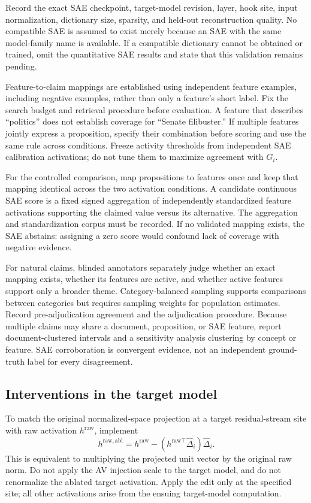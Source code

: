 Record the exact SAE checkpoint, target-model revision, layer, hook site,
input normalization, dictionary size, sparsity, and held-out reconstruction
quality. No compatible SAE is assumed to exist merely because an SAE with
the same model-family name is available. If a compatible dictionary cannot be
obtained or trained, omit the quantitative SAE results and state that this
validation remains pending.

Feature-to-claim mappings are established using independent feature examples,
including negative examples, rather than only a feature's short label. Fix the
search budget and retrieval procedure before evaluation. A feature that
describes ``politics'' does not establish coverage for ``Senate filibuster.''
If multiple features jointly express a proposition, specify their combination
before scoring and use the same rule across conditions. Freeze activity
thresholds from independent SAE calibration activations; do not tune them to
maximize agreement with $G_i$.

For the controlled comparison, map propositions to features once and keep
that mapping identical across the two activation conditions. A candidate
continuous SAE score is a fixed signed aggregation of independently
standardized feature activations supporting the claimed value versus its
alternative. The aggregation and standardization corpus must be recorded.
If no validated mapping exists, the SAE abstains: assigning a zero score would
confound lack of coverage with negative evidence.

For natural claims, blinded annotators separately judge whether an exact
mapping exists, whether its features are active, and whether active features
support only a broader theme. Category-balanced sampling supports comparisons
between categories but requires sampling weights for population estimates.
Record pre-adjudication agreement and the adjudication procedure. Because
multiple claims may share a document, proposition, or SAE feature, report
document-clustered intervals and a sensitivity analysis clustering by concept
or feature. SAE corroboration is convergent evidence, not an independent
ground-truth label for every disagreement.

\subsection{Interventions in the target model}

To match the original normalized-space projection at a target residual-stream
site with raw activation $h^{\mathrm{raw}}$, implement
\begin{equation}
 h^{\mathrm{raw,abl}}=h^{\mathrm{raw}}
 -(h^{\mathrm{raw}\top}\widehat\Delta_i)\widehat\Delta_i.
\end{equation}
This is equivalent to multiplying the projected unit vector by the original
raw norm. Do not apply the AV injection scale to the target model, and do not
renormalize the ablated target activation. Apply the edit only at the specified
site; all other activations arise from the ensuing target-model computation.

